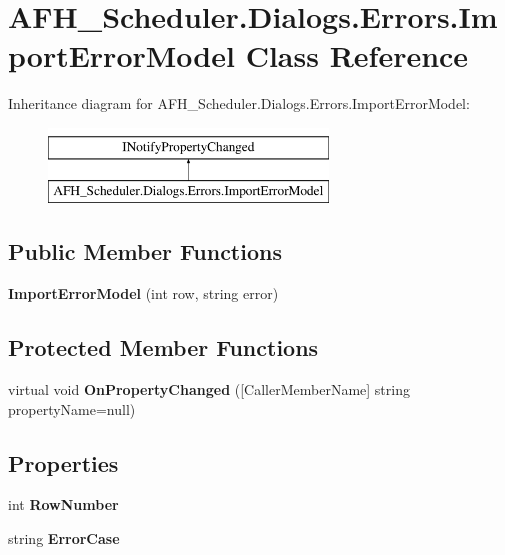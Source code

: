 \section{A\+F\+H\+\_\+\+Scheduler.\+Dialogs.\+Errors.\+Import\+Error\+Model Class Reference}
\label{class_a_f_h___scheduler_1_1_dialogs_1_1_errors_1_1_import_error_model}
Inheritance diagram for A\+F\+H\+\_\+\+Scheduler.\+Dialogs.\+Errors.\+Import\+Error\+Model\+:\begin{figure}[H]
\begin{center}
\leavevmode
\includegraphics[height=2.000000cm]{class_a_f_h___scheduler_1_1_dialogs_1_1_errors_1_1_import_error_model}
\end{center}
\end{figure}
\subsection*{Public Member Functions}
\begin{DoxyCompactItemize}
\item 
\mbox{\label{class_a_f_h___scheduler_1_1_dialogs_1_1_errors_1_1_import_error_model_afeea5f03ef98c1c857f56dec82ac16e7}} 
{\bfseries Import\+Error\+Model} (int row, string error)
\end{DoxyCompactItemize}
\subsection*{Protected Member Functions}
\begin{DoxyCompactItemize}
\item 
\mbox{\label{class_a_f_h___scheduler_1_1_dialogs_1_1_errors_1_1_import_error_model_a2f33cc233aa8f17b4d063b0472edc7a2}} 
virtual void {\bfseries On\+Property\+Changed} ([Caller\+Member\+Name] string property\+Name=null)
\end{DoxyCompactItemize}
\subsection*{Properties}
\begin{DoxyCompactItemize}
\item 
\mbox{\label{class_a_f_h___scheduler_1_1_dialogs_1_1_errors_1_1_import_error_model_a6e9809bfbfb522c0a4ad595bfad4c53d}} 
int {\bfseries Row\+Number}\hspace{0.3cm}{\ttfamily  [get, set]}
\item 
\mbox{\label{class_a_f_h___scheduler_1_1_dialogs_1_1_errors_1_1_import_error_model_abbf182a0778e48f9d96df7f7a8c50956}} 
string {\bfseries Error\+Case}\hspace{0.3cm}{\ttfamily  [get, set]}
\end{DoxyCompactItemize}
